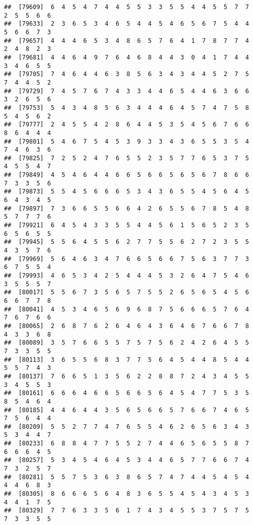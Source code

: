 \documentclass[
]{book}
\begin{document}
\begin{verbatim}
##  [79609]  6  4  5  4  7  4  4  5  5  3  3  5  5  4  4  5  5  7  7  2  5  5  6  6
##  [79633]  2  3  6  5  3  4  6  5  4  4  5  4  6  5  6  7  5  4  4  5  6  6  7  3
##  [79657]  4  4  4  6  5  3  4  8  6  5  7  6  4  1  7  8  7  7  4  2  4  8  2  3
##  [79681]  4  4  6  4  9  7  6  4  6  8  4  4  3  0  4  1  7  4  4  3  4  6  5  5
##  [79705]  7  4  6  4  4  6  3  8  5  6  3  4  3  4  4  5  2  7  5  7  4  4  5  2
##  [79729]  7  4  5  7  6  7  4  3  3  4  4  6  5  4  4  6  3  6  6  3  2  6  5  6
##  [79753]  5  4  3  4  8  5  6  3  4  4  4  6  4  5  7  4  7  5  8  5  4  5  6  2
##  [79777]  2  4  5  5  4  2  8  6  4  4  5  3  5  4  5  6  7  6  6  8  6  4  4  4
##  [79801]  5  4  6  7  5  4  5  3  9  3  3  4  3  6  5  5  3  5  4  7  4  6  3  6
##  [79825]  7  2  5  2  4  7  6  5  5  2  3  5  7  7  6  5  3  7  5  4  5  5  4  7
##  [79849]  4  5  4  6  4  4  6  6  5  6  6  5  6  5  6  7  8  6  6  7  3  3  5  6
##  [79873]  5  5  4  5  6  6  6  5  3  4  3  6  5  5  4  5  6  4  5  6  4  3  4  5
##  [79897]  7  3  6  6  5  5  6  6  4  2  6  5  5  6  7  8  5  4  8  5  7  7  7  6
##  [79921]  6  4  5  4  3  3  5  5  4  4  5  6  1  5  6  5  2  3  5  6  5  6  5  5
##  [79945]  5  5  6  4  5  5  6  2  7  7  5  5  6  2  7  2  3  5  5  4  3  5  7  6
##  [79969]  5  6  4  6  3  4  7  6  6  5  6  6  7  5  6  3  7  7  3  6  7  5  5  4
##  [79993]  4  6  5  3  4  2  5  4  4  4  5  3  2  6  4  7  5  4  6  3  5  5  5  7
##  [80017]  5  5  6  7  3  5  6  5  7  5  5  2  6  5  6  5  4  5  6  6  6  7  7  8
##  [80041]  4  5  3  4  6  5  6  9  6  8  7  5  6  6  6  5  7  6  4  7  6  7  6  6
##  [80065]  2  6  8  7  6  2  6  4  6  4  3  6  4  6  7  6  6  7  8  4  3  3  6  8
##  [80089]  3  5  7  6  6  5  5  7  5  7  5  6  2  4  2  6  4  5  5  7  3  3  5  5
##  [80113]  3  6  5  5  6  8  3  7  7  5  6  4  5  4  4  8  5  4  4  5  5  7  4  3
##  [80137]  7  6  6  5  1  3  5  6  2  2  8  8  7  2  4  3  4  5  5  3  4  5  5  3
##  [80161]  6  6  6  4  6  6  5  6  6  5  6  4  5  4  7  7  5  3  5  8  5  4  6  4
##  [80185]  4  4  6  4  4  3  5  6  5  6  6  5  7  6  6  7  4  6  5  7  5  6  4  4
##  [80209]  5  5  2  7  7  4  7  6  5  5  4  6  2  6  5  6  3  4  3  5  3  4  4  7
##  [80233]  6  8  8  4  7  7  5  5  2  7  4  4  6  5  6  5  5  8  7  6  6  6  4  5
##  [80257]  5  3  4  5  4  6  4  5  3  4  4  6  5  7  7  6  6  7  4  7  3  2  5  7
##  [80281]  5  5  7  5  3  6  3  8  6  5  7  4  7  4  4  5  4  5  4  4  4  6  8  3
##  [80305]  8  6  6  6  5  6  4  8  3  6  5  5  4  5  4  3  4  5  3  4  4  1  7  5
##  [80329]  7  7  6  3  3  5  6  1  7  4  3  4  5  5  3  7  5  7  5  7  3  3  5  5

\end{verbatim}
\end{document}

